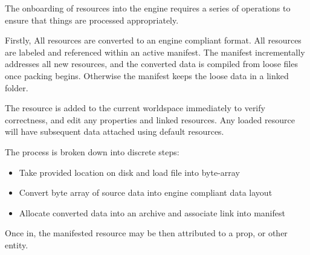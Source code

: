 The onboarding of resources into the engine requires a series of operations to ensure that things are processed appropriately.

Firstly, All resources are converted to an engine compliant format. All resources are labeled and referenced within an active manifest. The manifest incrementally addresses all new resources, and the converted data is compiled from loose files once packing begins. Otherwise the manifest keeps the loose data in a linked folder.

The resource is added to the current worldspace immediately to verify correctness, and edit any properties and linked resources. Any loaded resource will have subsequent data attached using default resources.

The process is broken down into discrete steps:

\begin{itemize}
    \item Take provided location on disk and load file into byte-array
    \item Convert byte array of source data into engine compliant data layout
    \item Allocate converted data into an archive and associate link into manifest
\end{itemize}

Once in, the manifested resource may be then attributed to a prop, or other entity. 